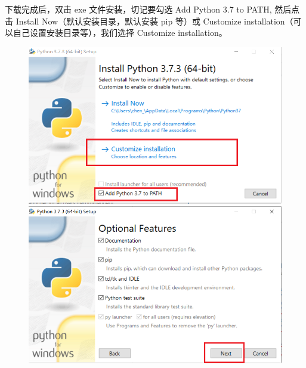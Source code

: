 下载完成后，双击 exe 文件安装，切记要勾选 Add Python 3.7 to PATH, 然后点击 Install Now（默认安装目录，默认安装 pip 等）或 Customize installation（可以自己设置安装目录等），我们选择 Customize installation。

\begin{figure}[ht]
  \centering
  \includegraphics[scale=0.4]{figure/chapter1/pythonDownload2.png}\quad
  \includegraphics[scale=0.4]{figure/chapter1/pythonDownload4.png}
\end{figure}

